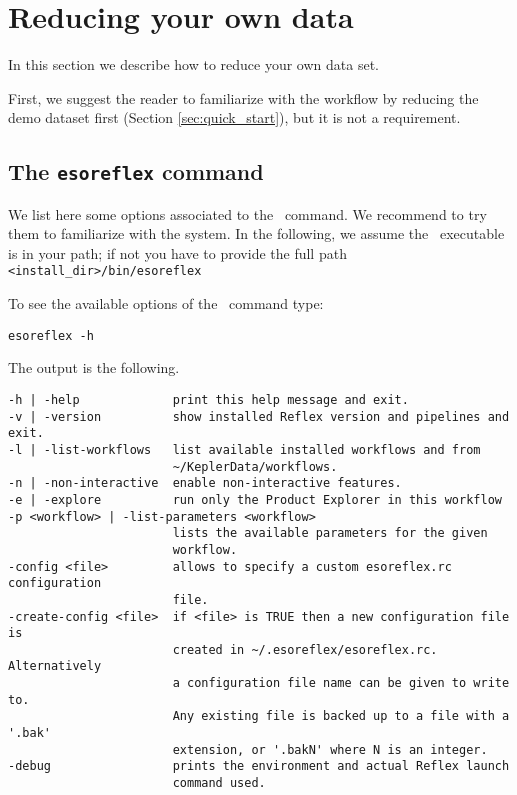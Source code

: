 \section{Reducing your own data}\label{sec:owndataset} 

In this section we describe how to reduce your own data set.

First, we suggest the reader to familiarize with the workflow by
reducing the demo dataset first (Section \ref{sec:quick_start}), but
it is not a requirement.


\subsection{The {\tt esoreflex} command}\label{sec:esoreflex_command}

We list here some options associated to the \ command. We
recommend to try them to familiarize with the system.  In the
following, we assume the \ executable is in your path; if not
you have to provide the full path {\tt <install\_dir>/bin/esoreflex}

To see the available options of the \ command type:
\begin{verbatim}
esoreflex -h
\end{verbatim}
The output is the following.
\begin{verbatim}
-h | -help             print this help message and exit.
-v | -version          show installed Reflex version and pipelines and exit.
-l | -list-workflows   list available installed workflows and from 
                       ~/KeplerData/workflows.
-n | -non-interactive  enable non-interactive features.
-e | -explore          run only the Product Explorer in this workflow
-p <workflow> | -list-parameters <workflow>
                       lists the available parameters for the given 
                       workflow.
-config <file>         allows to specify a custom esoreflex.rc configuration 
                       file.
-create-config <file>  if <file> is TRUE then a new configuration file is 
                       created in ~/.esoreflex/esoreflex.rc. Alternatively 
                       a configuration file name can be given to write to. 
                       Any existing file is backed up to a file with a '.bak' 
                       extension, or '.bakN' where N is an integer.
-debug                 prints the environment and actual Reflex launch 
                       command used.
\end{verbatim}



